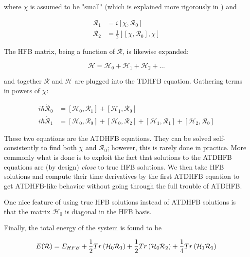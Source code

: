 \noindent where $\chi$ is assumed to be "small" (which is explained more rigorously in \cite{Baranger1978}) and

\begin{align}\label{densities}
\mathcal{R}_1 &= i\left[\chi, \mathcal{R}_0\right] \\
\mathcal{R}_2 &= \frac{1}{2}\left[\left[\chi, \mathcal{R}_0\right], \chi\right] 
\end{align}

\noindent The HFB matrix, being a function of $\mathcal{R}$, is likewise expanded:

\begin{equation*}
\mathcal{H} = \mathcal{H}_0 + \mathcal{H}_1 + \mathcal{H}_2 + \dots
\end{equation*}

\noindent and together $\mathcal{R}$ and $\mathcal{H}$ are plugged into the TDHFB equation. Gathering terms in powers of $\chi$:

\begin{align}\label{ATDHFB}
i\hbar\mathcal{\dot{R}}_0 &= \left[\mathcal{H}_0, \mathcal{R}_1\right] + \left[\mathcal{H}_1, \mathcal{R}_0\right] \\
i\hbar\mathcal{\dot{R}}_1 &= \left[\mathcal{H}_0, \mathcal{R}_0\right] + \left[\mathcal{H}_0, \mathcal{R}_2\right]
 + \left[\mathcal{H}_1, \mathcal{R}_1\right] + \left[\mathcal{H}_2, \mathcal{R}_0\right]
\end{align}

\noindent These two equations are the ATDHFB equations. They can be solved self-consistently to find both $\chi$ and $\mathcal{R}_0$; however, this is rarely done in practice. More commonly what is done is to exploit the fact that solutions to the ATDHFB equations are (by design) \textit{close} to true HFB solutions. We then take HFB solutions and compute their time derivatives by the first ATDHFB equation to get ATDHFB-like behavior without going through the full trouble of ATDHFB.

One nice feature of using true HFB solutions instead of ATDHFB solutions is that the matrix $\mathcal{H}_0$ is diagonal in the HFB basis.

Finally, the total energy of the system is found to be

\begin{equation*}
E(\mathcal{R}) = E_{HFB} + \frac{1}{2}\mathnormal{Tr}\left(\mathcal{H}_0\mathcal{R}_1\right) + \frac{1}{2}\mathnormal{Tr}\left(\mathcal{H}_0\mathcal{R}_2\right) + \frac{1}{4}\mathnormal{Tr}\left(\mathcal{H}_1\mathcal{R}_1\right)
\end{equation*}


